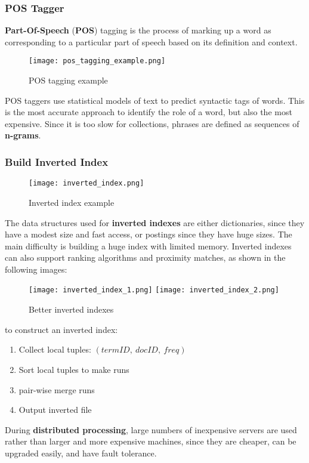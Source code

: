 \documentclass{article}
\begin{document}
\subsubsection{POS Tagger}
\textbf{Part-Of-Speech} (\textbf{POS}) tagging is the process of marking up a word as corresponding to a particular part of speech based on its definition and context.
\begin{figure}[h]
    \centering
    \texttt{[image: pos\_tagging\_example.png]}
    \caption{POS tagging example}
\end{figure}
POS taggers use statistical models of text to predict syntactic tags of words.
This is the most accurate approach to identify the role of a word, but also the most expensive.
Since it is too slow for collections, phrases are defined as sequences of \textbf{n-grams}.

\subsubsection{Build Inverted Index}
\begin{figure}[h]
    \centering
    \texttt{[image: inverted\_index.png]}
    \caption{Inverted index example}
\end{figure}
The data structures used for \textbf{inverted indexes} are either dictionaries, since they have a modest size and fast access, or postings since they have huge sizes.
The main difficulty is building a huge index with limited memory.
Inverted indexes can also support ranking algorithms and proximity matches, as shown in the following images:
\begin{figure}[H]
    \centering
    \texttt{[image: inverted\_index\_1.png]}
    \texttt{[image: inverted\_index\_2.png]}
    \caption{Better inverted indexes}
\end{figure}
to construct an inverted index:
\begin{enumerate}
    \item Collect local tuples: $(termID, \ docID, \ freq)$
    \item Sort local tuples to make runs
    \item pair-wise merge runs
    \item Output inverted file
\end{enumerate}
During \textbf{distributed processing}, large numbers of inexpensive servers are used rather than larger and more expensive machines, since they are cheaper, can be upgraded easily, and have fault tolerance.
\newpage
\end{document}
